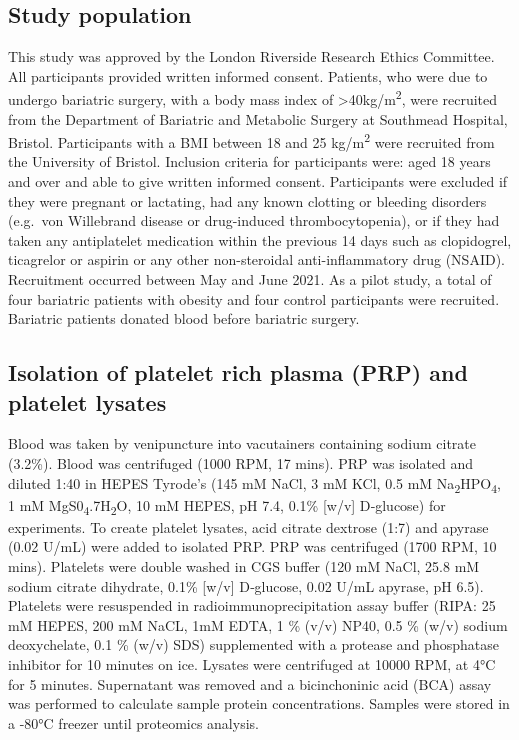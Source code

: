 \documentclass[11pt,twoside]{bristolthesis}
\begin{document}
\hypertarget{study-population-1}{%
\subsection{Study population}\label{study-population-1}}

This study was approved by the London Riverside Research Ethics Committee. All participants provided written informed consent. Patients, who were due to undergo bariatric surgery, with a body mass index of \textgreater40kg/m\textsuperscript{2}, were recruited from the Department of Bariatric and Metabolic Surgery at Southmead Hospital, Bristol. Participants with a BMI between 18 and 25 kg/m\textsuperscript{2} were recruited from the University of Bristol. Inclusion criteria for participants were: aged 18 years and over and able to give written informed consent. Participants were excluded if they were pregnant or lactating, had any known clotting or bleeding disorders (e.g.~von Willebrand disease or drug-induced thrombocytopenia), or if they had taken any antiplatelet medication within the previous 14 days such as clopidogrel, ticagrelor or aspirin or any other non-steroidal anti-inflammatory drug (NSAID). Recruitment occurred between May and June 2021. As a pilot study, a total of four bariatric patients with obesity and four control participants were recruited. Bariatric patients donated blood before bariatric surgery.

\hypertarget{isolation-of-platelet-rich-plasma-prp-and-platelet-lysates}{%
\subsection{Isolation of platelet rich plasma (PRP) and platelet lysates}\label{isolation-of-platelet-rich-plasma-prp-and-platelet-lysates}}

Blood was taken by venipuncture into vacutainers containing sodium citrate (3.2\%). Blood was centrifuged (1000 RPM, 17 mins). PRP was isolated and diluted 1:40 in HEPES Tyrode's (145 mM NaCl, 3 mM KCl, 0.5 mM Na\textsubscript{2}HPO\textsubscript{4}, 1 mM MgS0\textsubscript{4}.7H\textsubscript{2}O, 10 mM HEPES, pH 7.4, 0.1\% {[}w/v{]} D‐glucose) for experiments. To create platelet lysates, acid citrate dextrose (1:7) and apyrase (0.02 U/mL) were added to isolated PRP. PRP was centrifuged (1700 RPM, 10 mins). Platelets were double washed in CGS buffer (120 mM NaCl, 25.8 mM sodium citrate dihydrate, 0.1\% {[}w/v{]} D‐glucose, 0.02 U/mL apyrase, pH 6.5). Platelets were resuspended in radioimmunoprecipitation assay buffer (RIPA: 25 mM HEPES, 200 mM NaCL, 1mM EDTA, 1 \% (v/v) NP40, 0.5 \% (w/v) sodium deoxychelate, 0.1 \% (w/v) SDS) supplemented with a protease and phosphatase inhibitor for 10 minutes on ice. Lysates were centrifuged at 10000 RPM, at 4°C for 5 minutes. Supernatant was removed and a bicinchoninic acid (BCA) assay was performed to calculate sample protein concentrations. Samples were stored in a -80°C freezer until proteomics analysis.
\end{document}
